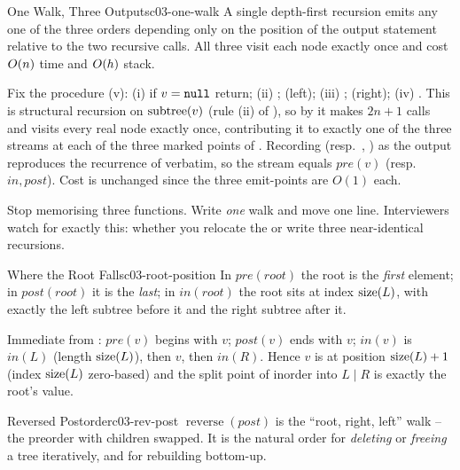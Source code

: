 \begin{theorem}{One Walk, Three Outputs}{c03-one-walk}
A single depth-first recursion emits any one of the three orders depending only on the
position of the output statement relative to the two recursive calls. All three visit
each node exactly once and cost $O(n)$ time and $O(h)$ stack.
\end{theorem}
\begin{proofbox}
Fix the procedure (v): (i) if $v=\texttt{null}$ return; (ii) ;
(left); (iii) ; (right); (iv) .
This is structural recursion on $\operatorname{subtree}(v)$ (rule (ii) of ),
so by  it makes $2n+1$ calls and visits every real node exactly
once, contributing it to exactly one of the three streams at each of the three marked
points of . Recording  (resp.\ ,
) as the output reproduces the recurrence of
 verbatim, so the stream equals $\mathit{pre}(v)$ (resp.\
$\mathit{in},\mathit{post}$). Cost is unchanged since the three emit-points are $O(1)$
each.
\end{proofbox}
\begin{insightbox}
Stop memorising three functions. Write \emph{one} walk and move one line. Interviewers
watch for exactly this: whether you relocate the \code{push} or write three near-identical
recursions.
\end{insightbox}

\begin{theorem}{Where the Root Falls}{c03-root-position}
In $\mathit{pre}(\mathit{root})$ the root is the \emph{first} element; in
$\mathit{post}(\mathit{root})$ it is the \emph{last}; in $\mathit{in}(\mathit{root})$ the
root sits at index $\operatorname{size}(L)$, with exactly the left subtree before it and the right
subtree after it.
\end{theorem}
\begin{proofbox}
Immediate from : $\mathit{pre}(v)$ begins with $v$;
$\mathit{post}(v)$ ends with $v$; $\mathit{in}(v)$ is $\mathit{in}(L)$ (length
$\operatorname{size}(L)$), then $v$, then $\mathit{in}(R)$. Hence $v$ is at position
$\operatorname{size}(L)+1$ (index $\operatorname{size}(L)$ zero-based) and the split point of inorder into $L\mid R$
is exactly the root's value.
\end{proofbox}
\begin{corollary}{Reversed Postorder}{c03-rev-post}
$\operatorname{reverse}(\mathit{post})$ is the ``root, right, left'' walk -- the preorder
with children swapped. It is the natural order for \emph{deleting} or \emph{freeing} a
tree iteratively, and for rebuilding bottom-up.
\end{corollary}

